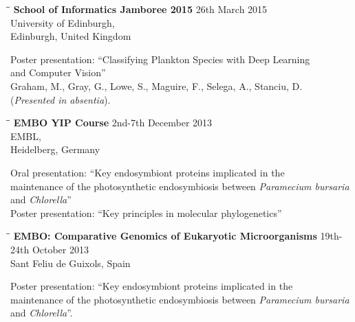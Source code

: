 \documentclass{res}
\begin{document}
\begin{resume}
\pagebreak
\begin{tabbing}
\hspace{2in}\= \hspace{2.6in}\= \kill
{\bf School of Informatics Jamboree 2015} \> \> 26th March 2015\\
\> \>University of Edinburgh,  \\
\> \> Edinburgh, United Kingdom\\
\end{tabbing}\vspace{-40pt}
Poster presentation: ``Classifying Plankton Species with Deep Learning \\
and Computer Vision''\\
Graham, M., Gray, G., Lowe, S., Maguire, F., Selega, A., Stanciu, D. \\
(\emph{Presented in absentia}).


\begin{tabbing}
\hspace{2in}\= \hspace{2.6in}\= \kill
{\bf EMBO YIP Course} \> \> 2nd-7th December 2013\\
\> \> EMBL, \\
\> \> Heidelberg, Germany\\
\end{tabbing}\vspace{-40pt}
Oral presentation: ``Key endosymbiont proteins implicated in the \\ maintenance of the photosynthetic endosymbiosis between \textit{Paramecium bursaria} \\ and \textit{Chlorella}''\\
Poster presentation: ``Key principles in molecular phylogenetics''

\vspace{-0.1in}
     \begin{tabbing} 
   \hspace{2in}\= \hspace{2.6in}\= \kill 
    {\bf EMBO: Comparative Genomics of Eukaryotic Microorganisms}
    \>  \> 19th-24th October 2013\\
                         \>    \> Sant Feliu de Guixols, Spain
   \end{tabbing}\vspace{-20pt}      
      Poster presentation: ``Key endosymbiont proteins implicated in the \\ maintenance of the photosynthetic endosymbiosis between \textit{Paramecium bursaria} \\ and \textit{Chlorella}''.
      \vspace{-0.1in}


\end{resume}
\end{document}
